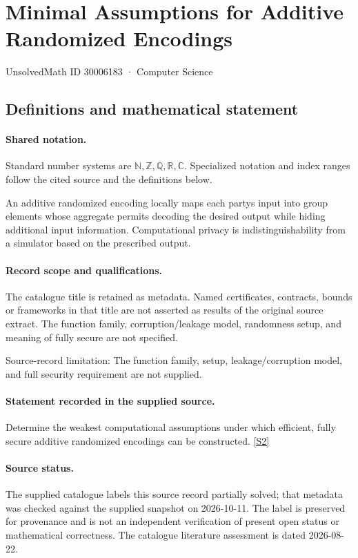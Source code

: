 \documentclass[11pt]{article}
\newcommand{\sref}[2]{\hyperlink{source:#1:#2}{[S#2]}}
\begin{document}
\setcounter{section}{30006182}
\section{Minimal Assumptions for Additive Randomized Encodings}\label{30006183}
{\small\sffamily UnsolvedMath ID 30006183 · Computer Science}
\subsection{Definitions and mathematical statement}

\paragraph{Shared notation.}Standard number systems are $\mathbb N,\mathbb Z,\mathbb Q,\mathbb R,\mathbb C$. Specialized notation and index ranges follow the cited source and the definitions below.


An additive randomized encoding locally maps each party\textquotesingle s input into group elements whose aggregate permits decoding the desired output while hiding additional input information. Computational privacy is indistinguishability from a simulator based on the prescribed output.
\paragraph{Record scope and qualifications.}
The catalogue title is retained as metadata. Named certificates, contracts, bounds or frameworks in that title are not asserted as results of the original source extract.
The function family, corruption/leakage model, randomness setup, and meaning of fully secure are not specified.

Source-record limitation: The function family, setup, leakage/corruption model, and full security requirement are not supplied.
\paragraph{Statement recorded in the supplied source.}
Determine the weakest computational assumptions under which efficient, fully secure additive randomized encodings can be constructed. \sref{30006183}{2}
\paragraph{Source status.}
The supplied catalogue labels this source record partially solved; that metadata was checked against the supplied snapshot on 2026-10-11. The label is preserved for provenance and is not an independent verification of present open status or mathematical correctness. The catalogue literature assessment is dated 2026-08-22.
\end{document}
